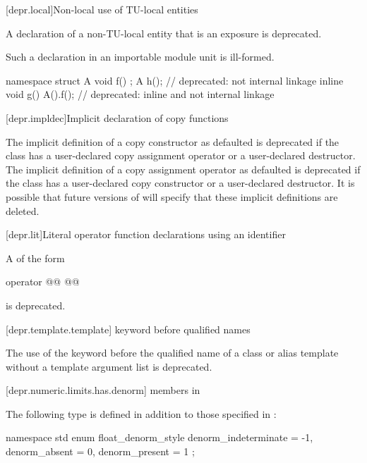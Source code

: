 [depr.local]{Non-local use of TU-local entities}

\pnum
A declaration of a non-TU-local entity that is an exposure
is deprecated.
\begin{note}
Such a declaration in an importable module unit is ill-formed.
\end{note}
\begin{example}
\begin{codeblock}
namespace {
  struct A {
    void f() {}
  };
}
A h();                          // deprecated: not internal linkage
inline void g() {A().f();}      // deprecated: inline and not internal linkage
\end{codeblock}
\end{example}

[depr.impldec]{Implicit declaration of copy functions}

\pnum
The implicit definition of a copy constructor
as defaulted is deprecated if the class has
a user-declared copy assignment operator or
a user-declared destructor.
The implicit definition of a copy assignment operator
as defaulted is deprecated if the class has
a user-declared copy constructor or
a user-declared destructor.
It is possible that future versions of \Cpp{} will specify
that these implicit definitions are deleted.

[depr.lit]{Literal operator function declarations using an identifier}

\pnum
A  of the form
\begin{codeblock}
operator @@ @@
\end{codeblock}
is deprecated.

[depr.template.template]{ keyword before qualified names}

\pnum
The use of the keyword 
before the qualified name of a class or alias template
without a template argument list is deprecated.

[depr.numeric.limits.has.denorm]{ members in }

\pnum
The following type is defined
in addition to those specified in :
%
\begin{codeblock}
namespace std {
  enum float_denorm_style {
    denorm_indeterminate = -1,
    denorm_absent = 0,
    denorm_present = 1
  };
}
\end{codeblock}

